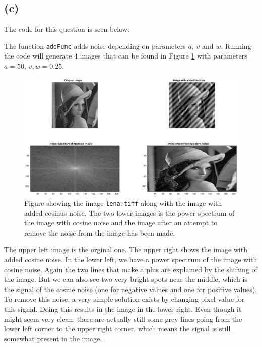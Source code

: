 \documentclass[a4paper]{article}
\begin{document}
\subsection{(c)}
The code for this question is seen below:

The function \texttt{addFunc} adds noise depending on parameters $a$, $v$ and $w$. Running the code will generate $4$ images that can be found in Figure \ref{fig2_3} with parameters $a=50$, $v,w=0.25$.
\begin{figure}[H]
  \centering
  \captionsetup{justification=centering}
  \includegraphics[width=\textwidth]{fig2_3b.eps}
  \caption{Figure showing the image \texttt{lena.tiff} along with the image with added cosinus noise. The two lower images is the power spectrum of the image with cosine noise and the image after an attempt to remove the noise from the image has been made.}
  \label{fig2_3}
\end{figure}
The upper left image is the orginal one. The upper right shows the image with added cosine noise. In the lower left, we have a power spectrum of the image with cosine noise. Again the two lines that make a plus are explained by the shifting of the image. But we can also see two very bright spots near the middle, which is the signal of the cosine noise (one for negative values and one for positive values). To remove this noise, a very simple solution exists by changing pixel value for this signal. Doing this results in the image in the lower right. Even though it might seem very clean, there are actually still some grey lines going from the lower left corner to the upper right corner, which means the signal is still somewhat present in the image.
\end{document}
